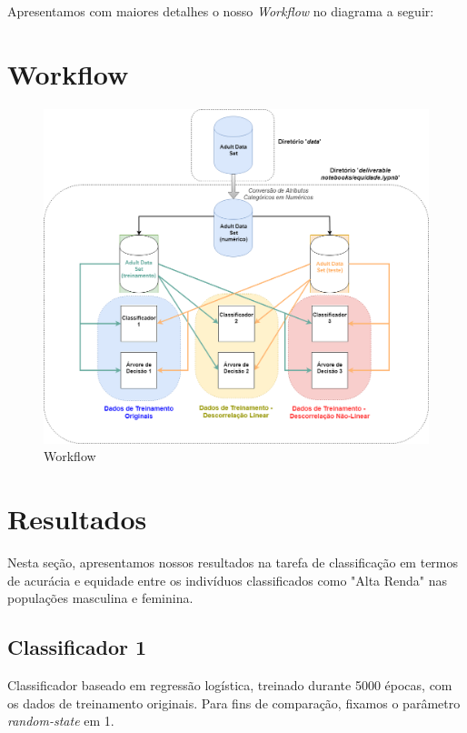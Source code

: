 \documentclass[11pt]{article}
\makeatletter
\def\maxwidth{\ifdim\Gin@nat@width>\linewidth\linewidth
    \else\Gin@nat@width\fi}
\let\Oldincludegraphics\includegraphics
\renewcommand{\includegraphics}[1]{\Oldincludegraphics[width=.8\maxwidth]{#1}}
\makeatother
\begin{document}
Apresentamos com maiores detalhes o nosso \emph{Workflow} no diagrama a
seguir:

    \section{Workflow}\label{workflow}

\begin{figure}
\centering
\includegraphics{../fig/WorkflowIA369.png}
\caption{Workflow}
\end{figure}

    \section{Resultados}\label{resultados}

Nesta seção, apresentamos nossos resultados na tarefa de classificação
em termos de acurácia e equidade entre os indivíduos classificados como
"Alta Renda" nas populações masculina e feminina.

    \subsection{Classificador 1}\label{classificador-1}

Classificador baseado em regressão logística, treinado durante 5000
épocas, com os dados de treinamento originais. Para fins de comparação,
fixamos o parâmetro \emph{random-state} em 1.
\end{document}
